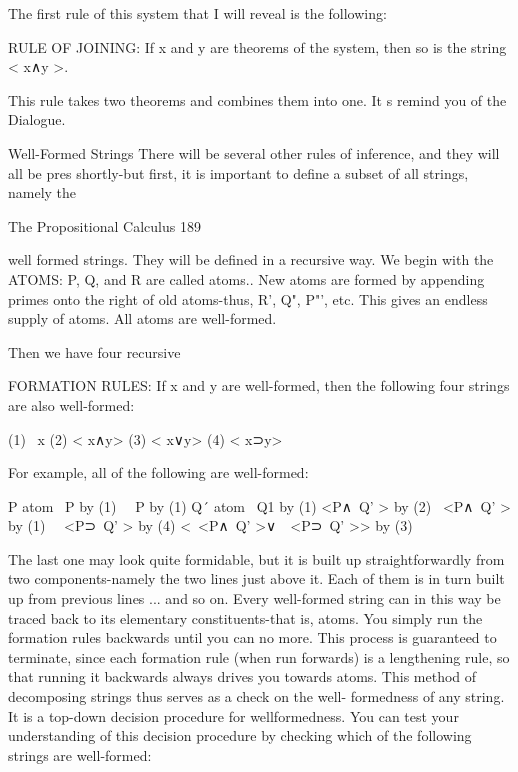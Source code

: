 The first rule of this system that I will reveal is the following:

RULE OF JOINING: If x and y are theorems of the system, then so is the string < x∧y >.

This rule takes two theorems and combines them into one. It s remind you of the
Dialogue.

Well-Formed Strings
There will be several other rules of inference, and they will all be pres shortly-but first, it
is important to define a subset of all strings, namely the




The Propositional Calculus                                                                 189

well formed strings. They will be defined in a recursive way. We begin with the
ATOMS: P, Q, and R are called atoms.. New atoms are formed by appending primes
onto the right of old atoms-thus, R', Q", P"', etc. This gives an endless supply of atoms.
All atoms are well-formed.

Then we have four recursive

FORMATION RULES: If x and y are well-formed, then the following four strings are
also well-formed:

(1)    ~x
(2)    < x∧y>
(3)    < x∨y>
(4)    < x⊃y>

For example, all of the following are well-formed:

P                                     atom
~P                                    by (1)
~~P                                   by (1)
Q´                                    atom
~Q1                                   by (1)
<P∧~Q' >                              by (2)
~<P∧~Q' >                             by (1)
~~<P⊃~Q' >                            by (4)
<~<P∧~Q' >∨~~<P⊃~Q' >>                by (3)

The last one may look quite formidable, but it is built up straightforwardly from two
components-namely the two lines just above it. Each of them is in turn built up from
previous lines ... and so on. Every well-formed string can in this way be traced back to its
elementary constituents-that is, atoms. You simply run the formation rules backwards
until you can no more. This process is guaranteed to terminate, since each formation rule
(when run forwards) is a lengthening rule, so that running it backwards always drives you
towards atoms.
        This method of decomposing strings thus serves as a check on the well-
formedness of any string. It is a top-down decision procedure for wellformedness. You
can test your understanding of this decision procedure by checking which of the
following strings are well-formed:

